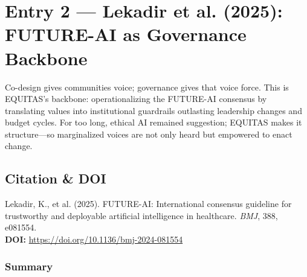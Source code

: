 \documentclass[11pt,twoside]{article}
\begin{document}
\newpage

\label{entry2}
\section*{Entry 2 --- Lekadir et al. (2025): FUTURE-AI as Governance Backbone}

\vspace{-0.3cm}

Co-design gives communities voice; governance gives that voice force. This is \textsc{EQUITAS}'s backbone: operationalizing the FUTURE-AI consensus by translating values into institutional guardrails outlasting leadership changes and budget cycles. For too long, ethical AI remained suggestion; EQUITAS makes it structure---so marginalized voices are not only heard but empowered to enact change.

\vspace{-0.3cm}

\subsection*{Citation \& DOI}

\vspace{-0.3cm}

Lekadir, K., et al. (2025). FUTURE-AI: International consensus guideline for trustworthy and deployable artificial intelligence in healthcare. \textit{BMJ}, 388, e081554. \\

\textbf{DOI:} \href{https://doi.org/10.1136/bmj-2024-081554}{https://doi.org/10.1136/bmj-2024-081554}

\vspace{-0.3cm}

\subsubsection*{Summary}

\vspace{-0.3cm}
\end{document}
